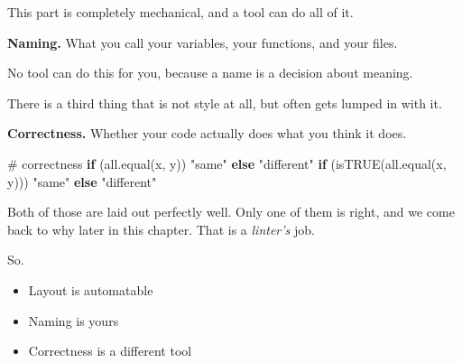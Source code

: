 \documentclass[
  letterpaper,
  justified,
  a4paper]{tufte-book}
\makeatletter
\newenvironment{Shaded}{\begin{snugshade}}{\end{snugshade}}
\newcommand{\CommentTok}[1]{\textcolor[rgb]{0.37,0.37,0.37}{#1}}
\newcommand{\ControlFlowTok}[1]{\textcolor[rgb]{0.00,0.23,0.31}{\textbf{#1}}}
\newcommand{\DecValTok}[1]{\textcolor[rgb]{0.68,0.00,0.00}{#1}}
\newcommand{\FunctionTok}[1]{\textcolor[rgb]{0.28,0.35,0.67}{#1}}
\newcommand{\NormalTok}[1]{\textcolor[rgb]{0.00,0.23,0.31}{#1}}
\newcommand{\OtherTok}[1]{\textcolor[rgb]{0.00,0.23,0.31}{#1}}
\newcommand{\SpecialCharTok}[1]{\textcolor[rgb]{0.37,0.37,0.37}{#1}}
\newcommand{\StringTok}[1]{\textcolor[rgb]{0.13,0.47,0.30}{#1}}
\providecommand{\tightlist}{%
  \setlength{\itemsep}{0pt}\setlength{\parskip}{0pt}}
\providecommand{\tightlist}{%
  \setlength{\itemsep}{0pt}\setlength{\parskip}{0pt}}
\let\rbporigShaded\Shaded
\let\rbporigendShaded\endShaded
\renewenvironment{Shaded}{%
  \begingroup
  \ifdim\linewidth=\rbpbodywidth
    \advance\linewidth by \@tufte@overhang
    \advance\hsize by \@tufte@overhang
    \advance\columnwidth by \@tufte@overhang
  \fi
  \rbporigShaded
}{%
  \rbporigendShaded
  \endgroup
}
\makeatother
\begin{document}
This part is completely mechanical, and a tool can do all of it.

\textbf{Naming.} What you call your variables, your functions, and your
files.

\begin{Shaded}
\end{Shaded}

No tool can do this for you, because a name is a decision about meaning.

There is a third thing that is not style at all, but often gets lumped
in with it.

\textbf{Correctness.} Whether your code actually does what you think it
does.

\begin{Shaded}
\begin{Highlighting}[]
\CommentTok{\# correctness}
\ControlFlowTok{if}\NormalTok{ (}\FunctionTok{all.equal}\NormalTok{(x, y)) }\StringTok{"same"} \ControlFlowTok{else} \StringTok{"different"}
\ControlFlowTok{if}\NormalTok{ (}\FunctionTok{isTRUE}\NormalTok{(}\FunctionTok{all.equal}\NormalTok{(x, y))) }\StringTok{"same"} \ControlFlowTok{else} \StringTok{"different"}
\end{Highlighting}
\end{Shaded}

Both of those are laid out perfectly well. Only one of them is right,
and we come back to why later in this chapter. That is a \emph{linter's}
job.

So.

\begin{itemize}
\tightlist
\item
  Layout is automatable
\item
  Naming is yours
\item
  Correctness is a different tool
\end{itemize}
\end{document}
